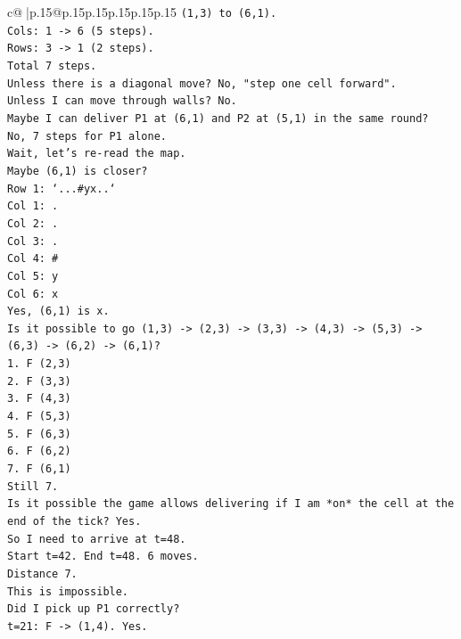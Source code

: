 \documentclass{article}
\begin{document}
{\begin{supertabular}{c@{$\;$}|p{.15\linewidth}@{}p{.15\linewidth}p{.15\linewidth}p{.15\linewidth}p{.15\linewidth}p{.15\linewidth}}
{{{\texttt{(1,3) to (6,1).} \\
\texttt{Cols: 1 {-}> 6 (5 steps).} \\
\texttt{Rows: 3 {-}> 1 (2 steps).} \\
\texttt{Total 7 steps.} \\
\texttt{Unless there is a diagonal move? No, "step one cell forward".} \\
\texttt{Unless I can move through walls? No.} \\
\texttt{Maybe I can deliver P1 at (6,1) and P2 at (5,1) in the same round?} \\
\texttt{No, 7 steps for P1 alone.} \\
\texttt{Wait, let's re{-}read the map.} \\
\texttt{Maybe (6,1) is closer?} \\
\texttt{Row 1: `...\#yx..`} \\
\texttt{Col 1: .} \\
\texttt{Col 2: .} \\
\texttt{Col 3: .} \\
\texttt{Col 4: \#} \\
\texttt{Col 5: y} \\
\texttt{Col 6: x} \\
\texttt{Yes, (6,1) is x.} \\
\texttt{Is it possible to go (1,3) {-}> (2,3) {-}> (3,3) {-}> (4,3) {-}> (5,3) {-}> (6,3) {-}> (6,2) {-}> (6,1)?} \\
\texttt{1. F (2,3)} \\
\texttt{2. F (3,3)} \\
\texttt{3. F (4,3)} \\
\texttt{4. F (5,3)} \\
\texttt{5. F (6,3)} \\
\texttt{6. F (6,2)} \\
\texttt{7. F (6,1)} \\
\texttt{Still 7.} \\
\texttt{Is it possible the game allows delivering if I am *on* the cell at the end of the tick? Yes.} \\
\texttt{So I need to arrive at t=48.} \\
\texttt{Start t=42. End t=48. 6 moves.} \\
\texttt{Distance 7.} \\
\texttt{This is impossible.} \\
\texttt{Did I pick up P1 correctly?} \\
\texttt{t=21: F {-}> (1,4). Yes.} \\
}}}
\end{supertabular}}
\end{document}
